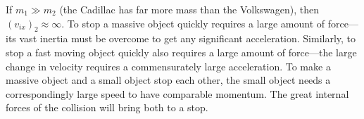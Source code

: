 {If $m_{1}\gg m_{2}$ (the Cadillac has far more mass than the Volkswagen), then $(v_{ix})_{2} \approx \infty$. To stop a massive object quickly requires a large amount of force---its vast inertia must be overcome to get any significant acceleration. Similarly, to stop a fast moving object quickly also requires a large amount of force---the large change in velocity requires a commensurately large acceleration. To make a massive object and a small object stop each other, the small object needs a correspondingly large speed to have comparable momentum. The great internal forces of the collision will bring both to a stop.
}